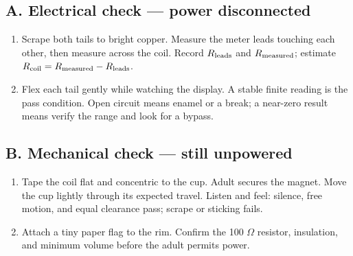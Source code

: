 \begin{center}
\end{center}

\subsection{A. Electrical check --- power disconnected}
\begin{enumerate}
\item Scrape both tails to bright copper. Measure the meter leads touching each
other, then measure across the coil. Record \(R_{\rm leads}\) and
\(R_{\rm measured}\); estimate \(R_{\rm coil}=R_{\rm measured}-R_{\rm leads}\).
\item Flex each tail gently while watching the display. A stable finite reading
is the pass condition. Open circuit means enamel or a break; a near-zero result
means verify the range and look for a bypass.
\end{enumerate}

\subsection{B. Mechanical check --- still unpowered}
\begin{enumerate}[resume]
\item Tape the coil flat and concentric to the cup. Adult secures the magnet.
Move the cup lightly through its expected travel. Listen and feel: silence,
free motion, and equal clearance pass; scrape or sticking fails.
\item Attach a tiny paper flag to the rim. Confirm the 100 \(\Omega\) resistor,
insulation, and minimum volume before the adult permits power.
\end{enumerate}

